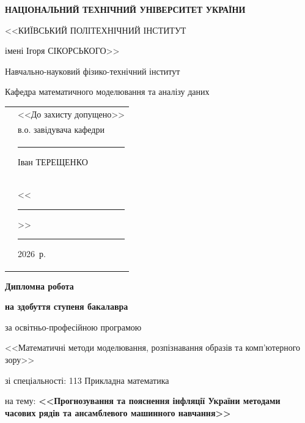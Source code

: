 \documentclass{bachelor_thesis}
\newcommand{\reportTitle}{Прогнозування та пояснення інфляції України методами часових рядів та ансамблевого машинного навчання}
\newcommand{\YearOfDefence}{2026}
\begin{document}
\pagestyle{plain}

\thispagestyle{empty}
\linespread{1.1}

\begin{center}
{\bfseries
НАЦІОНАЛЬНИЙ ТЕХНІЧНИЙ УНІВЕРСИТЕТ УКРАЇНИ \par
<<КИЇВСЬКИЙ ПОЛІТЕХНІЧНИЙ ІНСТИТУТ \par
імені Ігоря СІКОРСЬКОГО>>\par
Навчально-науковий фізико-технічний інститут\par
\medskip
Кафедра математичного моделювання та аналізу даних\par
}
\end{center}

\vspace{5mm}

\begin{tabularx}{\textwidth}{XX}
                       & <<До захисту допущено>> \\[06pt]
                       & в.о. завідувача кафедри \\[06pt]
                       & \rule{2.5cm}{0.25pt} Іван ТЕРЕЩЕНКО \\[06pt]
                       & <<\rule{0.5cm}{0.25pt}>> \rule{2.5cm}{0.25pt} \YearOfDefence~р.
\end{tabularx}

\begin{center}
\vspace{5mm}
{\bfseries\huge Дипломна робота} \par
{\bfseries на здобуття ступеня бакалавра} \par
за освітньо-професійною програмою \par
<<Математичні методи моделювання, розпізнавання образів та комп'ютерного зору>> \par
\end{center}

зі спеціальності: 113 Прикладна математика \par
на тему: \textbf{<<\reportTitle>>}

\vspace{5mm}
\end{document}
